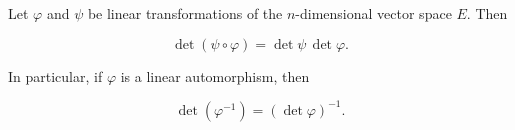 Let $\varphi$ and $\psi$ be linear transformations of the $n$-dimensional vector space $E$. Then

$$\det (\psi \circ \varphi) = \det \psi \, \det \varphi.$$

In particular, if $\varphi$ is a linear automorphism, then

$$\det(\varphi^{-1}) = (\det \varphi)^{-1}.$$
